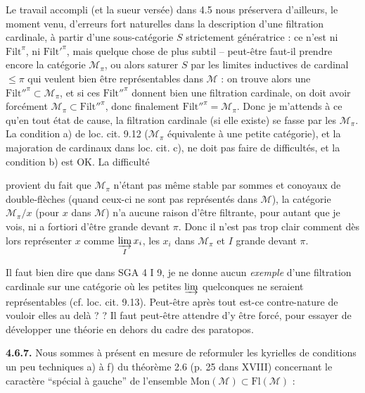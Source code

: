 \documentclass[11pt]{article}
\newcommand{\printedpage}[1]{\marginpar{\footnotesize p.~#1}}
\newcommand{\msp}[1]{\marginpar{\footnotesize [#1]}}
\newcommand{\Mc}{\mathcal{M}}
\begin{document}
\msp{page 155}

Le travail accompli (et la sueur versée) dans 4.5 nous préservera d'ailleurs, le moment venu, d'erreurs fort naturelles dans la description d'une filtration cardinale, à partir d'une sous-catégorie $S$ strictement génératrice : ce n'est ni $\mathrm{Filt}^{\pi}$, ni $\mathrm{Filt}'^{\pi}$, mais quelque chose de plus subtil -- peut-être faut-il prendre encore la catégorie $\Mc_{\pi}$, ou alors saturer $S$ par les limites inductives de cardinal $\leqslant \pi$ qui veulent bien être représentables dans $\Mc$ : on trouve alors une $\mathrm{Filt}''^{\pi} \subset \Mc_{\pi}$, et si ces $\mathrm{Filt}''^{\pi}$ donnent bien une filtration cardinale, on doit avoir forcément $\Mc_{\pi} \subset \mathrm{Filt}''^{\pi}$, donc finalement $\mathrm{Filt}''^{\pi} = \Mc_{\pi}$. Donc je m'attends à ce qu'en tout état de cause, la filtration cardinale (si elle existe) se fasse par les $\Mc_{\pi}$. La condition a) de loc. cit. 9.12 ($\Mc_{\pi}$ équivalente à une petite catégorie), et la majoration de cardinaux dans loc. cit. c), ne doit pas faire de difficultés, et la condition b) est OK. La difficulté

\msp{page 156}

provient du fait que $\Mc_{\pi}$ n'étant pas même stable par sommes et conoyaux de double-flèches (quand ceux-ci ne sont pas représentés dans $\Mc$), la catégorie $\Mc_{\pi}/x$ (pour $x$ dans $\Mc$) n'a aucune raison d'être filtrante, pour autant que je vois, ni a fortiori
\printedpage{51}
d'être grande devant $\pi$. Donc il n'est pas trop clair comment dès lors représenter $x$ comme $\varinjlim\limits_{I} x_i$, les $x_i$ dans $\Mc_{\pi}$ et $I$ grande devant $\pi$.

Il faut bien dire que dans SGA 4 I 9, je ne donne aucun \textit{exemple} d'une filtration cardinale sur une catégorie où les petites $\varinjlim$ quelconques ne seraient représentables (cf. loc. cit. 9.13). Peut-être après tout est-ce contre-nature de vouloir elles au delà ? ? Il faut peut-être attendre d'y être forcé, pour essayer de développer une théorie en dehors du cadre des paratopos.

\msp{page 157}

\textbf{4.6.7.} Nous sommes à présent en mesure de reformuler les kyrielles de conditions un peu techniques a) à f) du théorème 2.6 (p. 25 dans XVIII) concernant le caractère “spécial à gauche” de l'ensemble $\mathrm{Mon}(\Mc) \subset \mathrm{Fl}(\Mc)$ :
\end{document}
